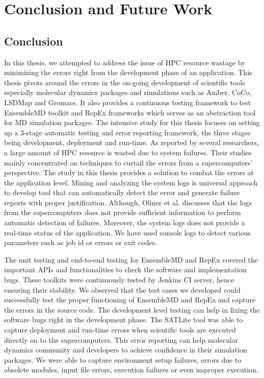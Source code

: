 \documentclass[10pt]{ruthesis}
\begin{document}
\chapter{Conclusion and Future Work}

\section{Conclusion}
In this thesis, we attempted to address the issue of HPC resource wastage by minimizing the errors right from the development phase of an application. This thesis pivots around the errors in the on-going development of scientific tools especially molecular dynamics packages and simulations such as Amber, CoCo, LSDMap and Gromacs. It also provides a continuous testing framework to test EnsembleMD toolkit and RepEx frameworks which serves as an abstraction tool for MD simulation packages. The intensive study for this thesis focuses on setting up a 3-stage automatic testing and error reporting framework, the three stages being development, deployment and run-time. As reported by several researchers, a large amount of HPC resource is wasted due to system failures. Their studies mainly concentrated on techniques to curtail the errors from a supercomputers' perspective. The study in this thesis provides a solution to combat the errors at the application level. Mining and analyzing the system logs is universal approach to develop tool that can automatically detect the error and generate failure reports with proper justification. Although, Oliner et al. \cite{ref14} discusses that the logs from the supercomputers does not provide sufficient information to perform automatic detection of failures. Moreover, the system logs does not provide a real-time status of the application. We have used console logs to detect various parameters such as job id or errors or exit codes.

The unit testing and end-to-end testing for EnsembleMD and RepEx covered the important APIs and functionalities to check the software and implementation bugs. These toolkits were continuously tested by Jenkins CI server, hence ensuring their stability. We observed that the test cases we developed could successfully test the proper functioning of EnsembleMD and RepEx and capture the errors in the source code. The development level testing can help in fixing the software bugs right in the development phase. The SATLite tool was able to capture deployment and run-time errors when scientific tools are executed directly on to the supercomputers. This error reporting can help molecular dynamics community and developers to achieve confidence in their simulation packages. We were able to capture environment setup failures, errors due to obsolete modules, input file errors, execution failures or even improper execution. 
\end{document}
